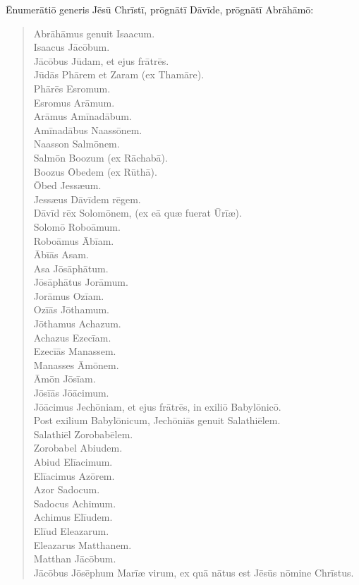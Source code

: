 
\Caput
\Versus Ēnumerātiō generis Jēsū Chrīstī, prōgnātī Dāvīde, prōgnātī Abrāhāmō:

\begin{verse}
\begin{patverse*}
\Versus Abrāhāmus genuit Isaacum.\\
Isaacus Jācōbum.\\
Jācōbus Jūdam, et ejus frātrēs.\\
\Versus Jūdās Phārem et Zaram (ex Thamāre).\\
Phārēs Esromum.\\
Esromus Arāmum.\\ 
\Versus Arāmus Amīnadābum.\\
Amīnadābus Naassōnem.\\
Naasson Salmōnem.\\
\Versus Salmōn Boozum (ex Rāchabā).\\
Boozus Ōbedem (ex Rūthā).\\
Ōbed Jessæum.\\
\Versus Jessæus Dāvīdem rēgem.\\
Dāvīd rēx Solomōnem, (ex eā quæ fuerat Ūrīæ).\\
\Versus Solomō Roboāmum.\\
Roboāmus Ābīam.\\
Ābīās Asam.\\
\Versus Asa Jōsāphātum.\\
Jōsāphātus Jorāmum.\\
Jorāmus Ozīam.\\
\Versus Ozīās Jōthamum.\\
Jōthamus Achazum.\\
Achazus Ezecīam.\\
\Versus Ezecīās Manassem.\\
Manasses Āmōnem.\\
Āmōn Jōsīam.\\ 
\Versus Jōsīās Jōācimum.\\
Jōācimus Jechōniam, et ejus frātrēs, in exiliō Babylōnicō.\\
\Versus Post exilium Babylōnicum, Jechōniās genuit Salathiēlem.\\
Salathiēl Zorobabēlem.\\ 
\Versus Zorobabel Abiudem.\\
Abiud Elīacimum.\\
Elīacimus Azōrem.\\ 
\Versus Azor Sadocum.\\
Sadocus Achimum.\\
Achimus Elīudem.\\ 
\Versus Elīud Eleazarum.\\
Eleazarus Matthanem.\\
Matthan Jācōbum.\\ 
\Versus Jācōbus Jōsēphum Marīæ virum, ex quā nātus est Jēsūs nōmine Chrīstus.
\end{patverse*}
\end{verse}


